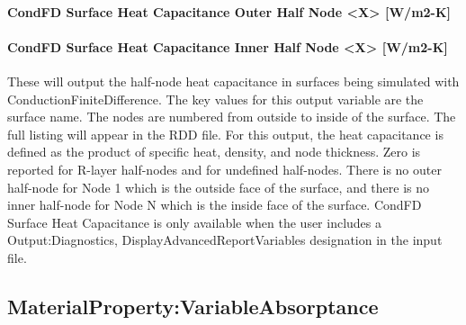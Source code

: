 \paragraph{CondFD Surface Heat Capacitance Outer Half Node \textless{}X\textgreater{} {[}W/m2-K{]}}\label{condfd-surface-heat-capacitance-outer-half-node-x-wm2-k}

\paragraph{CondFD Surface Heat Capacitance Inner Half Node \textless{}X\textgreater{} {[}W/m2-K{]}}\label{condfd-surface-heat-capacitance-inner-half-node-x-wm2-k}

These will output the half-node heat capacitance in surfaces being simulated with ConductionFiniteDifference. The key values for this output variable are the surface name. The nodes are numbered from outside to inside of the surface. The full listing will appear in the RDD file. For this output, the heat capacitance is defined as the product of specific heat, density, and node thickness. Zero is reported for R-layer half-nodes and for undefined half-nodes. There is no outer half-node for Node 1 which is the outside face of the surface, and there is no inner half-node for Node N which is the inside face of the surface. CondFD Surface Heat Capacitance is only available when the user includes a Output:Diagnostics, DisplayAdvancedReportVariables designation in the input file.

\subsection{MaterialProperty:VariableAbsorptance}\label{materialpropertyvariableabsorptance}

